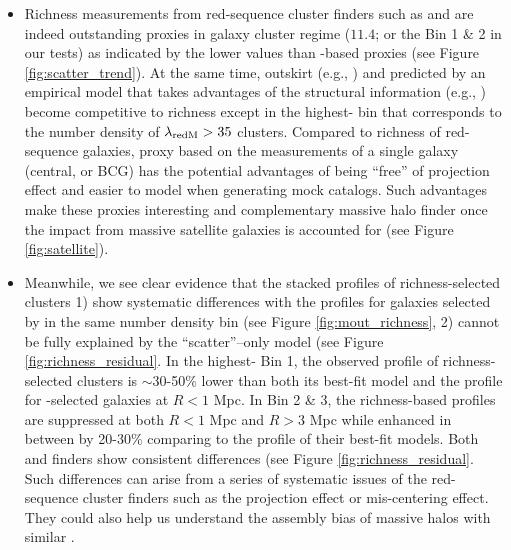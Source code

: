 \documentclass[fleqn,usenatbib,useAMS,english]{mnras}
\begin{document}
\begin{itemize}
        \item Richness measurements from red-sequence cluster finders such as \redm{} and \camira{}
            are indeed outstanding \mvir{} proxies in galaxy cluster regime
            (\logmh{}$11.4$; or the Bin 1 \& 2 in our tests) as indicated by the lower
            \sigmh{} values than \mstar{}-based proxies (see Figure \ref{fig:scatter_trend}).
            At the same time, outskirt \mstar{} (e.g., ) and \mvir{} predicted
            by an empirical model that takes advantages of the structural information (e.g.,
            \masap{}) become competitive to richness except in the highest-\mvir{} bin that
            corresponds to the number density of $\lambda_{\rm redM} > 35$ clusters.
            Compared to richness of red-sequence galaxies, \mvir{} proxy based on the \mstar{}
            measurements of a single galaxy (central, or BCG) has the potential advantages of
            being ``free'' of projection effect and easier to model when generating mock catalogs.
            Such advantages make these proxies interesting and complementary massive halo finder
            once the impact from massive satellite galaxies is accounted for
            (see Figure \ref{fig:satellite}).

        \item Meanwhile, we see clear evidence that the stacked \dsigma{} profiles of
            richness-selected clusters
            1) show systematic differences with the profiles for
            galaxies selected by \mstar{} in the same number density bin
            (see Figure \ref{fig:mout_richness},
            2) cannot be fully explained by the ``scatter''--only model
            (see Figure \ref{fig:richness_residual}.
            In the highest-\mvir{} Bin 1, the observed \dsigma{} profile of richness-selected
            clusters is $\sim 30$-50\% lower than both its best-fit model and the profile for
            -selected galaxies at $R < 1$ Mpc.
            In Bin 2 \& 3, the richness-based \dsigma{} profiles are suppressed at both
            $R < 1$ Mpc and $R > 3$ Mpc while enhanced in between by 20-30\% comparing to
            the \dsigma{} profile of their best-fit models.
            Both \redm{} and \camira{} finders show consistent differences
            (see Figure \ref{fig:richness_residual}.
            Such differences can arise from a series of systematic issues of the red-sequence
            cluster finders such as the projection effect or mis-centering effect.
            They could also help us understand the assembly bias of massive halos with
            similar \mvir{}.

    \end{itemize}
\end{document}
